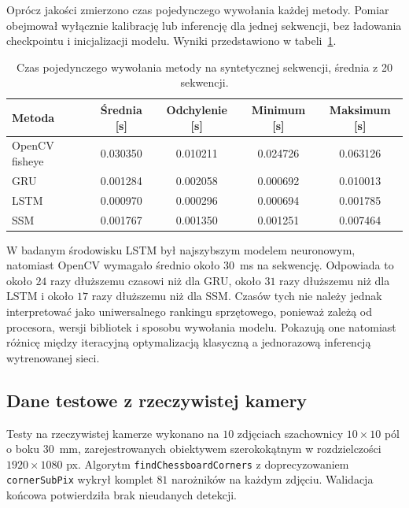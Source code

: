 Oprócz jakości zmierzono czas pojedynczego wywołania każdej metody. Pomiar
obejmował wyłącznie kalibrację lub inferencję dla jednej sekwencji, bez
ładowania checkpointu i inicjalizacji modelu. Wyniki przedstawiono w
tabeli~\ref{tab:czasy-syntetyczne}.

\begin{table}[htbp]
  \centering
  \small
  \begin{tabular}{@{}lcccc@{}}
    \toprule
    \textbf{Metoda} & \textbf{Średnia [s]} & \textbf{Odchylenie [s]} & \textbf{Minimum [s]} & \textbf{Maksimum [s]} \\
    \midrule
    OpenCV fisheye & 0.030350 & 0.010211 & 0.024726 & 0.063126 \\
    GRU            & 0.001284 & 0.002058 & 0.000692 & 0.010013 \\
    LSTM           & 0.000970 & 0.000296 & 0.000694 & 0.001785 \\
    SSM            & 0.001767 & 0.001350 & 0.001251 & 0.007464 \\
    \bottomrule
  \end{tabular}
  \caption{Czas pojedynczego wywołania metody na syntetycznej sekwencji, średnia z 20 sekwencji.}
  \label{tab:czasy-syntetyczne}
\end{table}

W badanym środowisku LSTM był najszybszym modelem neuronowym, natomiast
OpenCV wymagało średnio około $30$~ms na sekwencję. Odpowiada to około
$24$ razy dłuższemu czasowi niż dla GRU, około $31$ razy dłuższemu niż dla
LSTM i około $17$ razy dłuższemu niż dla SSM. Czasów tych nie należy jednak
interpretować jako uniwersalnego rankingu sprzętowego, ponieważ zależą od
procesora, wersji bibliotek i sposobu wywołania modelu. Pokazują one
natomiast różnicę między iteracyjną optymalizacją klasyczną a jednorazową
inferencją wytrenowanej sieci.

\subsection{Dane testowe z rzeczywistej kamery}
\label{sec:dane-realne}

Testy na rzeczywistej kamerze wykonano na $10$ zdjęciach szachownicy
$10\times10$ pól o boku $30$~mm, zarejestrowanych obiektywem szerokokątnym w
rozdzielczości $1920\times1080$ px. Algorytm \texttt{findChessboardCorners}
z doprecyzowaniem \texttt{cornerSubPix} wykrył komplet $81$ narożników na
każdym zdjęciu. Walidacja końcowa potwierdziła brak nieudanych detekcji.

